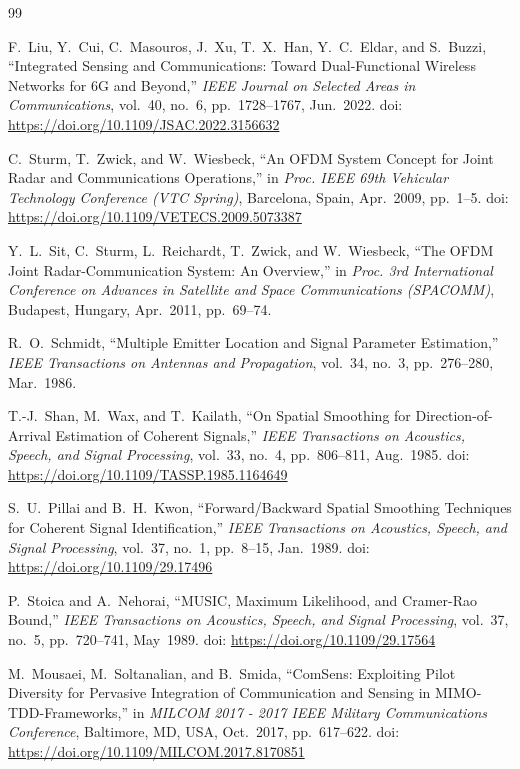 \documentclass[11pt]{article}
\begin{document}
\begin{thebibliography}{99}

F.~Liu, Y.~Cui, C.~Masouros, J.~Xu, T.~X.~Han, Y.~C.~Eldar, and S.~Buzzi,
``Integrated Sensing and Communications: Toward Dual-Functional Wireless Networks for 6G and Beyond,''
\emph{IEEE Journal on Selected Areas in Communications},
vol.~40, no.~6, pp.~1728--1767, Jun.~2022.
doi: \url{https://doi.org/10.1109/JSAC.2022.3156632}

C.~Sturm, T.~Zwick, and W.~Wiesbeck,
``An OFDM System Concept for Joint Radar and Communications Operations,''
in \emph{Proc. IEEE 69th Vehicular Technology Conference (VTC Spring)},
Barcelona, Spain, Apr.~2009, pp.~1--5.
doi: \url{https://doi.org/10.1109/VETECS.2009.5073387}

Y.~L.~Sit, C.~Sturm, L.~Reichardt, T.~Zwick, and W.~Wiesbeck,
``The OFDM Joint Radar-Communication System: An Overview,''
in \emph{Proc. 3rd International Conference on Advances in Satellite and Space Communications (SPACOMM)},
Budapest, Hungary, Apr.~2011, pp.~69--74.

R.~O.~Schmidt,
``Multiple Emitter Location and Signal Parameter Estimation,''
\emph{IEEE Transactions on Antennas and Propagation},
vol.~34, no.~3, pp.~276--280, Mar.~1986.

T.-J.~Shan, M.~Wax, and T.~Kailath,
``On Spatial Smoothing for Direction-of-Arrival Estimation of Coherent Signals,''
\emph{IEEE Transactions on Acoustics, Speech, and Signal Processing},
vol.~33, no.~4, pp.~806--811, Aug.~1985.
doi: \url{https://doi.org/10.1109/TASSP.1985.1164649}

S.~U.~Pillai and B.~H.~Kwon,
``Forward/Backward Spatial Smoothing Techniques for Coherent Signal Identification,''
\emph{IEEE Transactions on Acoustics, Speech, and Signal Processing},
vol.~37, no.~1, pp.~8--15, Jan.~1989.
doi: \url{https://doi.org/10.1109/29.17496}

P.~Stoica and A.~Nehorai,
``MUSIC, Maximum Likelihood, and Cramer-Rao Bound,''
\emph{IEEE Transactions on Acoustics, Speech, and Signal Processing},
vol.~37, no.~5, pp.~720--741, May~1989.
doi: \url{https://doi.org/10.1109/29.17564}

M.~Mousaei, M.~Soltanalian, and B.~Smida,
``ComSens: Exploiting Pilot Diversity for Pervasive Integration of Communication and Sensing in MIMO-TDD-Frameworks,''
in \emph{MILCOM 2017 - 2017 IEEE Military Communications Conference},
Baltimore, MD, USA, Oct.~2017, pp.~617--622.
doi: \url{https://doi.org/10.1109/MILCOM.2017.8170851}

\end{thebibliography}
\end{document}
